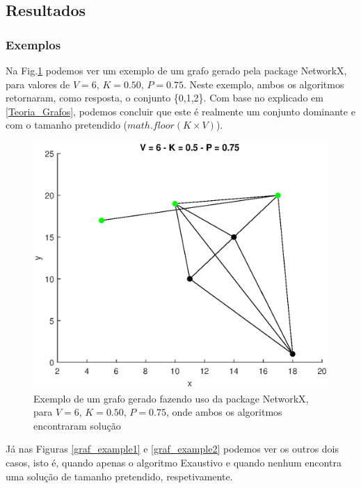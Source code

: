 \documentclass{revdetua}
\begin{document}
\subsection{Resultados}

\subsubsection{Exemplos}

Na Fig.\ref{graf_example} podemos ver um exemplo de um grafo gerado pela package NetworkX, para valores de $V = 6$, $K = 0.50$, $P = 0.75$. Neste exemplo, ambos os algoritmos retornaram, como resposta, o conjunto \{0,1,2\}. Com base no explicado em \ref{Teoria_Grafos}, podemos concluir que este é realmente um conjunto dominante e com o tamanho pretendido ($math.floor(K\times V)$).

\begin{figure}[h!]
\centering
\includegraphics[scale = 0.5]{Figs/example_graph.eps}
\caption{Exemplo de um grafo gerado fazendo uso da package NetworkX, para  $V = 6$, $K = 0.50$, $P = 0.75$, onde ambos os algoritmos encontraram solução}
\label{graf_example}
\end{figure}

Já nas Figuras \ref{graf_example1} e \ref{graf_example2} podemos ver os outros dois casos, isto é, quando apenas o algoritmo Exaustivo e quando nenhum encontra uma solução de tamanho pretendido, respetivamente.
\end{document}
